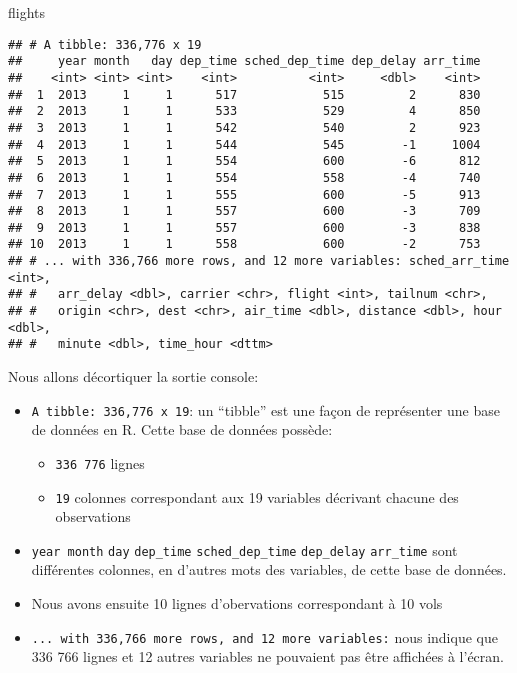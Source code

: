 \documentclass[]{book}
\newenvironment{Shaded}{\begin{snugshade}}{\end{snugshade}}
\newcommand{\NormalTok}[1]{#1}
\providecommand{\tightlist}{%
  \setlength{\itemsep}{0pt}\setlength{\parskip}{0pt}}
\begin{document}
\begin{Shaded}
\begin{Highlighting}[]
\NormalTok{flights}
\end{Highlighting}
\end{Shaded}

\begin{verbatim}
## # A tibble: 336,776 x 19
##     year month   day dep_time sched_dep_time dep_delay arr_time
##    <int> <int> <int>    <int>          <int>     <dbl>    <int>
##  1  2013     1     1      517            515         2      830
##  2  2013     1     1      533            529         4      850
##  3  2013     1     1      542            540         2      923
##  4  2013     1     1      544            545        -1     1004
##  5  2013     1     1      554            600        -6      812
##  6  2013     1     1      554            558        -4      740
##  7  2013     1     1      555            600        -5      913
##  8  2013     1     1      557            600        -3      709
##  9  2013     1     1      557            600        -3      838
## 10  2013     1     1      558            600        -2      753
## # ... with 336,766 more rows, and 12 more variables: sched_arr_time <int>,
## #   arr_delay <dbl>, carrier <chr>, flight <int>, tailnum <chr>,
## #   origin <chr>, dest <chr>, air_time <dbl>, distance <dbl>, hour <dbl>,
## #   minute <dbl>, time_hour <dttm>
\end{verbatim}

Nous allons décortiquer la sortie console:

\begin{itemize}
\tightlist
\item
  \texttt{A\ tibble:\ 336,776\ x\ 19}: un ``tibble'' est une façon de
  représenter une base de données en R. Cette base de données possède:

  \begin{itemize}
  \tightlist
  \item
    \texttt{336\ 776} lignes
  \item
    \texttt{19} colonnes correspondant aux 19 variables décrivant
    chacune des observations
  \end{itemize}
\item
  \texttt{year\ month} \texttt{day} \texttt{dep\_time}
  \texttt{sched\_dep\_time} \texttt{dep\_delay} \texttt{arr\_time} sont
  différentes colonnes, en d'autres mots des variables, de cette base de
  données.
\item
  Nous avons ensuite 10 lignes d'obervations correspondant à 10 vols
\item
  \texttt{...\ with\ 336,766\ more\ rows,\ and\ 12\ more\ variables:}
  nous indique que 336 766 lignes et 12 autres variables ne pouvaient
  pas être affichées à l'écran.
\end{itemize}
\end{document}
